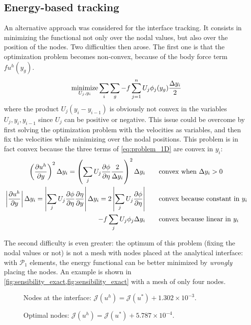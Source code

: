 \documentclass[11 pt]{report}
\begin{document}
\FloatBarrier
\subsection{Energy-based tracking}
An alternative approach was considered for the interface tracking. It consists in minimizing the functional not only over the nodal values, but also over the position of the nodes. Two difficulties then arose. The first one is that the optimization problem becomes non-convex, because of the body force term $fu^h(y_g)$.
\begin{equation}
    \operatorname*{minimize}_{U_j, y_i} \sum_{i} \sum_{g} -f \sum_{j=1}^{n} U_{j} \phi_j(y_g) \frac{\Delta y_i}{2}
\end{equation}
where the product $U_j (y_{i}-y_{i-1})$ is obviously not convex in the variables $U_j, y_i, y_{i-1}$ since $U_j$ can be positive or negative. This issue could be overcome by first solving the optimization problem with the velocities as variables, and then fix the velocities while minimizing over the nodal positions. This problem is in fact convex because the three terms of \eqref{eq:problem_1D} are convex in $y_i$:
\begin{align}
    \left(\pdv{u^h}{y}\right)^2 \Delta y_{i} = \left(\sum_j U_j\pdv{\phi}{\eta} \frac{2}{\Delta y_i}\right)^2 \Delta y_{i} &\qquad \text{convex when } \Delta y_i > 0\\
    \left|\pdv{u^h}{y}\right| \Delta y_{i} = \left|\sum_j U_j\pdv{\phi}{\eta} \pdv{\eta}{y}\right| \Delta y_{i} = 2\left|\sum_j U_j\pdv{\phi}{\eta} \right| &\qquad \text{convex because constant in } y_i\\
    -f\sum_j U_j \phi_j \Delta y_i &\qquad \text{convex because linear in } y_i
\end{align}

The second difficulty is even greater: the optimum of this problem (fixing the nodal values or not) is not a mesh with nodes placed at the analytical interface: with $\mathcal{P}_1$ elements, the energy functional can be better minimized by \textit{wrongly} placing the nodes. An example is shown in \cref{fig:sensibility_exact,fig:sensibility_exact} with a mesh of only four nodes.

\begin{figure}[!b]
    \centering
    
    \caption{Nodes at the interface: $\mathcal{J}(u^h) = \mathcal{J}(u^*) + 1.302\times 10^{-3}$.}
    \label{fig:sensibility_exact}
\end{figure}
\begin{figure}[!t]
    \centering
    
    \caption{Optimal nodes: $\mathcal{J}(u^h) = \mathcal{J}(u^*) + 5.787\times 10^{-4}$.}
    \label{fig:sensibility_bad}
\end{figure}
\end{document}
